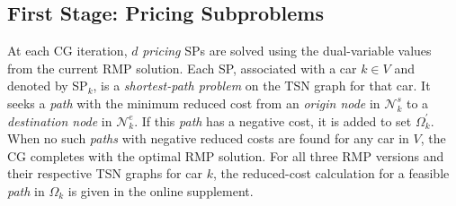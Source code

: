 \documentclass[12pt]{article}
\begin{document}





\subsection{First Stage: Pricing Subproblems}\label{sec4-2}
At each CG iteration, $d$ \textit{pricing} SPs are solved using the dual-variable values from the current RMP solution. Each SP, associated with a car $k\in V$ and denoted by SP$_k$, is a \textit{shortest-path problem} on the TSN graph for that car. It seeks a \textit{path} with the minimum reduced cost from an \textit{origin node} in $\mathcal{N}^s_k$ to a \textit{destination node} in $\mathcal{N}^e_k$. If this \textit{path} has a negative cost, it is added to set $\Omega_k^{\prime}$. When no such \textit{paths} with negative reduced costs are found for any car in $V$, the CG completes with the optimal RMP solution. For all three RMP versions and their respective TSN graphs for car $k$, the reduced-cost calculation for a feasible \textit{path} in $\Omega_k$ is given in the online supplement.
\end{document}
